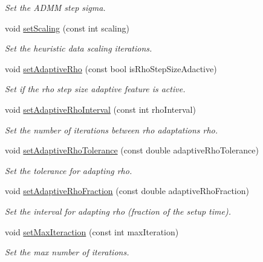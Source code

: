 \begin{DoxyCompactItemize}
\begin{DoxyCompactList}\small\item\em Set the A\+D\+MM step sigma. \end{DoxyCompactList}\item 
void \mbox{\hyperlink{classOsqpEigen_1_1Settings_a879a1fec8d21859d4cdcaafdb6df4554}{set\+Scaling}} (const int scaling)
\begin{DoxyCompactList}\small\item\em Set the heuristic data scaling iterations. \end{DoxyCompactList}\item 
void \mbox{\hyperlink{classOsqpEigen_1_1Settings_a9aa2c776ed96d6cc02fbbf29e3d70f2f}{set\+Adaptive\+Rho}} (const bool is\+Rho\+Step\+Size\+Adactive)
\begin{DoxyCompactList}\small\item\em Set if the rho step size adaptive feature is active. \end{DoxyCompactList}\item 
void \mbox{\hyperlink{classOsqpEigen_1_1Settings_a499bb35ff72b900bf0063f7f8be679de}{set\+Adaptive\+Rho\+Interval}} (const int rho\+Interval)
\begin{DoxyCompactList}\small\item\em Set the number of iterations between rho adaptations rho. \end{DoxyCompactList}\item 
void \mbox{\hyperlink{classOsqpEigen_1_1Settings_afb3740497a1c9ecef66bc1c142169604}{set\+Adaptive\+Rho\+Tolerance}} (const double adaptive\+Rho\+Tolerance)
\begin{DoxyCompactList}\small\item\em Set the tolerance for adapting rho. \end{DoxyCompactList}\item 
void \mbox{\hyperlink{classOsqpEigen_1_1Settings_a82bb52fd369ecfc177fbccc1d5e510d8}{set\+Adaptive\+Rho\+Fraction}} (const double adaptive\+Rho\+Fraction)
\begin{DoxyCompactList}\small\item\em Set the interval for adapting rho (fraction of the setup time). \end{DoxyCompactList}\item 
void \mbox{\hyperlink{classOsqpEigen_1_1Settings_ac670100dbf41f46a99122b58795038da}{set\+Max\+Iteraction}} (const int max\+Iteration)
\begin{DoxyCompactList}\small\item\em Set the max number of iterations. \end{DoxyCompactList}\item 

\end{DoxyCompactItemize}
